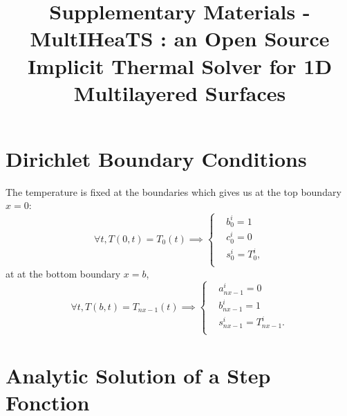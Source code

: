 \documentclass[sn-basic, Numbered]{sn-jnl}
\begin{document}

\title{Supplementary Materials - MultIHeaTS : an Open Source Implicit Thermal Solver for 1D Multilayered Surfaces}

\author*[1]{ }
\author[1,2]{ }





\maketitle


\section{Dirichlet Boundary Conditions}
The temperature is fixed at the boundaries which gives us at the top boundary $x=0$:
\begin{equation}
    \forall t, T(0, t) = T_0(t) \implies
    \begin{cases}
        &b_0^i = 1 \\
        &c_0^i = 0 \\
        &s_0^i = T_0^i, \\
    \end{cases}  
\end{equation}
at at the bottom boundary $x=b$,
\begin{equation}
    \forall t, T(b, t) = T_{nx-1}(t) \implies
    \begin{cases}
        &a_{nx-1}^i = 0 \\
        &b_{nx-1}^i = 1 \\
        &s_{nx-1}^i = T_{nx-1}^i. \\
    \end{cases}  
\end{equation}


\section{Analytic Solution of a Step Fonction}
\label{sup:ana}
\end{document}
